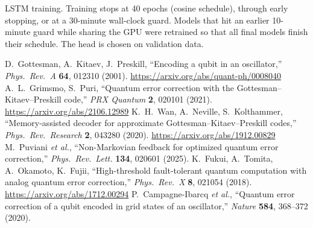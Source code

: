 \documentclass[11pt,letterpaper]{article}
\begin{document}
\begin{table}[H]
\centering\small

\caption{LSTM training. Training stops at 40 epochs (cosine schedule),
through early stopping, or at a 30-minute wall-clock guard. Models that hit
an earlier 10-minute guard while sharing the GPU were retrained so that all
final models finish their schedule. The head is chosen on validation data.}
\label{tab:training}
\end{table}

\begin{thebibliography}{9}
 D.~Gottesman, A.~Kitaev, J.~Preskill, ``Encoding a qubit in an
  oscillator,'' \emph{Phys.\ Rev.\ A} \textbf{64}, 012310 (2001).
  \url{https://arxiv.org/abs/quant-ph/0008040}
 A.~L.~Grimsmo, S.~Puri, ``Quantum error correction with the
  Gottesman--Kitaev--Preskill code,'' \emph{PRX Quantum} \textbf{2}, 020101
  (2021). \url{https://arxiv.org/abs/2106.12989}
 K.~H.~Wan, A.~Neville, S.~Kolthammer, ``Memory-assisted decoder
  for approximate Gottesman--Kitaev--Preskill codes,'' \emph{Phys.\ Rev.\
  Research} \textbf{2}, 043280 (2020). \url{https://arxiv.org/abs/1912.00829}
\bibitem{puviani} M.~Puviani \emph{et al.}, ``Non-Markovian feedback for
  optimized quantum error correction,'' \emph{Phys.\ Rev.\ Lett.}
  \textbf{134}, 020601 (2025).
 K.~Fukui, A.~Tomita, A.~Okamoto, K.~Fujii, ``High-threshold
  fault-tolerant quantum computation with analog quantum error correction,''
  \emph{Phys.\ Rev.\ X} \textbf{8}, 021054 (2018).
  \url{https://arxiv.org/abs/1712.00294}
 P.~Campagne-Ibarcq \emph{et al.}, ``Quantum error
  correction of a qubit encoded in grid states of an oscillator,''
  \emph{Nature} \textbf{584}, 368--372 (2020).
\end{thebibliography}
\end{document}

